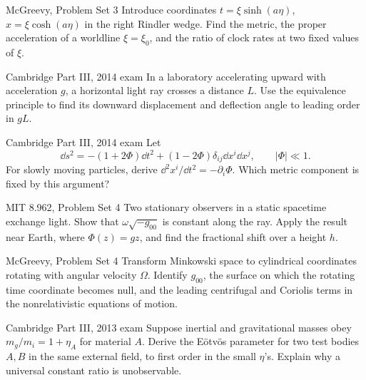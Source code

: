 \begin{exercises}

\begin{exercise}{McGreevy, Problem Set 3}
Introduce coordinates \(t=\xi\sinh(a\eta)\),
\(x=\xi\cosh(a\eta)\) in the right Rindler wedge.  Find the metric, the proper
acceleration of a worldline \(\xi=\xi_0\), and the ratio of clock rates at two
fixed values of \(\xi\).
\end{exercise}

\begin{exercise}{Cambridge Part III, 2014 exam}
In a laboratory accelerating upward with acceleration \(g\), a horizontal
light ray crosses a distance \(L\).  Use the equivalence principle to find its
downward displacement and deflection angle to leading order in \(gL\).
\end{exercise}

\begin{exercise}{Cambridge Part III, 2014 exam}
Let
\[
\dd s^2=-(1+2\Phi)\dd t^2+(1-2\Phi)\delta_{ij}\dd x^i\dd x^j,
\qquad |\Phi|\ll1.
\]
For slowly moving particles, derive \(\dd^2x^i/\dd t^2=-\partial_i\Phi\).
Which metric component is fixed by this argument?
\end{exercise}

\begin{exercise}{MIT 8.962, Problem Set 4}
Two stationary observers in a static spacetime exchange light.  Show that
\(\omega\sqrt{-g_{00}}\) is constant along the ray.  Apply the result near
Earth, where \(\Phi(z)=gz\), and find the fractional shift over a height \(h\).
\end{exercise}

\begin{exercise}{McGreevy, Problem Set 4}
Transform Minkowski space to cylindrical coordinates rotating with angular
velocity \(\Omega\).  Identify \(g_{00}\), the surface on which the rotating
time coordinate becomes null, and the leading centrifugal and Coriolis terms
in the nonrelativistic equations of motion.
\end{exercise}

\begin{exercise}{Cambridge Part III, 2013 exam}
Suppose inertial and gravitational masses obey
\(m_g/m_i=1+\eta_A\) for material \(A\).  Derive the Eötvös parameter for two
test bodies \(A,B\) in the same external field, to first order in the small
\(\eta\)'s.  Explain why a universal constant ratio is unobservable.
\end{exercise}


\end{exercises}
